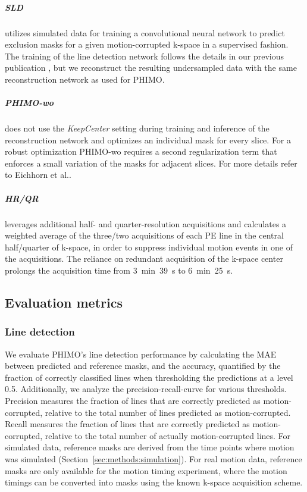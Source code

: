 \documentclass[AMA,STIX2COL]{MRM}
\begin{document}
\subparagraph{SLD \cite{Oksuz_2020,Eichhorn_2023}} utilizes simulated data for training a convolutional neural network to predict exclusion masks for a given motion-corrupted k-space in a supervised fashion. The training of the line detection network follows the details in our previous publication \cite{Eichhorn_2023}, but we reconstruct the resulting undersampled data with the same reconstruction network as used for PHIMO.

\subparagraph{PHIMO-wo \cite{Eichhorn_2024}} does not use the \textit{KeepCenter} setting during training and inference of the reconstruction network and optimizes an individual mask for every slice. For a robust optimization PHIMO-wo requires a second regularization term that enforces a small variation of the masks for adjacent slices. For more details refer to Eichhorn et al.\cite{Eichhorn_2024}.

\subparagraph{HR/QR \cite{Noth_2014}} leverages additional half- and quarter-resolution acquisitions and calculates a weighted average of the three/two acquisitions of each PE line in the central half/quarter of k-space, in order to suppress individual motion events in one of the acquisitions. The reliance on redundant acquisition of the k-space center prolongs the acquisition time from 3~min~39~s to 6~min~25~s.



\subsection{Evaluation metrics} \label{sec:methods:eval}
\subsubsection{Line detection}  \label{sec:methods:line_det}
We evaluate PHIMO's line detection performance by calculating the MAE between predicted and reference masks, and the accuracy, quantified by the fraction of correctly classified lines when thresholding the predictions at a level 0.5. Additionally, we analyze the precision-recall-curve for various thresholds. 
Precision measures the fraction of lines that are correctly predicted as motion-corrupted, relative to the total number of lines predicted as motion-corrupted.
Recall measures the fraction of lines that are correctly predicted as motion-corrupted, relative to the total number of actually motion-corrupted lines.
For simulated data, reference masks are derived from the time points where motion was simulated (Section~\ref{sec:methods:simulation}). For real motion data, reference masks are only available for the motion timing experiment, where the motion timings can be converted into masks using the known k-space acquisition scheme.
\end{document}
